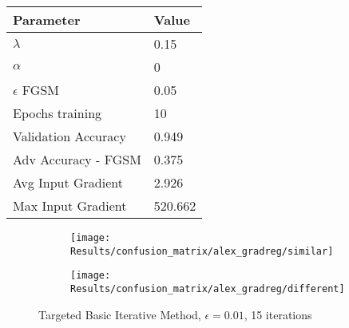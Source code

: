 \documentclass[draft,final]{vutinfth} %
\begin{document}
\begin{table}[h]
  \centering
  \begin{tabular}{ll}
    \toprule
			Parameter			& Value   \\
    \midrule
			$\lambda$								& 0.15		\\
			$\alpha$								& 0				\\
			$\epsilon$ FGSM					& 0.05		\\
			Epochs training					& 10			\\
			
			Validation Accuracy			& 0.949		\\
			Adv Accuracy - FGSM			& 0.375		\\
			
			Avg Input Gradient			& 2.926		\\
			Max Input Gradient			& 520.662 \\
    \bottomrule
  \end{tabular}
\end{table}


\begin{figure}[h]
  \begin{subfigure}[b]{0.5\columnwidth}
		\centering
    \texttt{[image: Results/confusion\_matrix/alex\_gradreg/similar]}%
    \label{fig:exp:cm:alex_gradreg:similar}
  \end{subfigure}
  \begin{subfigure}[b]{0.5\columnwidth}
		\centering
    \texttt{[image: Results/confusion\_matrix/alex\_gradreg/different]}
    \label{fig:exp:cm:alex_gradreg:different}
  \end{subfigure}
  \caption{Targeted Basic Iterative Method, $\epsilon = 0.01$, 15 iterations}
\end{figure}
\clearpage
\end{document}
